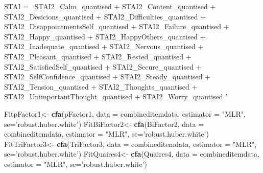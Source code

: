 \documentclass[]{article}
\newenvironment{Shaded}{\begin{snugshade}}{\end{snugshade}}
\newcommand{\KeywordTok}[1]{\textcolor[rgb]{0.13,0.29,0.53}{\textbf{#1}}}
\newcommand{\DataTypeTok}[1]{\textcolor[rgb]{0.13,0.29,0.53}{#1}}
\newcommand{\StringTok}[1]{\textcolor[rgb]{0.31,0.60,0.02}{#1}}
\newcommand{\NormalTok}[1]{#1}
\begin{document}
\begin{Shaded}
\begin{Highlighting}[]
\StringTok{STAI =~ STAI2_Calm_quantised +}
\StringTok{        STAI2_Content_quantised +}
\StringTok{        STAI2_Desicions_quantised +}
\StringTok{        STAI2_Difficulties_quantised +}
\StringTok{        STAI2_DisappointmentsSelf_quantised +}
\StringTok{        STAI2_Failure_quantised +}
\StringTok{        STAI2_Happy_quantised +}
\StringTok{        STAI2_HappyOthers_quantised +}
\StringTok{        STAI2_Inadequate_quantised +}
\StringTok{        STAI2_Nervous_quantised +}
\StringTok{        STAI2_Pleasant_quantised +}
\StringTok{        STAI2_Rested_quantised +}
\StringTok{        STAI2_SatisfiedSelf_quantised +}
\StringTok{        STAI2_Secure_quantised +}
\StringTok{        STAI2_SelfConfidence_quantised +}
\StringTok{        STAI2_Steady_quantised +}
\StringTok{        STAI2_Tension_quantised +}
\StringTok{        STAI2_Thoughts_quantised +}
\StringTok{        STAI2_UnimportantThought_quantised +}
\StringTok{        STAI2_Worry_quantised}
\StringTok{'}

\NormalTok{FitpFactor1<-}\StringTok{ }\KeywordTok{cfa}\NormalTok{(pFactor1, }\DataTypeTok{data =}\NormalTok{ combineditemdata, }\DataTypeTok{estimator =} \StringTok{"MLR"}\NormalTok{, }\DataTypeTok{se=}\StringTok{'robust.huber.white'}\NormalTok{)}
\NormalTok{FitBiFactor2<-}\StringTok{ }\KeywordTok{cfa}\NormalTok{(BiFactor2, }\DataTypeTok{data =}\NormalTok{ combineditemdata, }\DataTypeTok{estimator =} \StringTok{"MLR"}\NormalTok{, }\DataTypeTok{se=}\StringTok{'robust.huber.white'}\NormalTok{)}
\NormalTok{FitTriFactor3<-}\StringTok{ }\KeywordTok{cfa}\NormalTok{(TriFactor3, }\DataTypeTok{data =}\NormalTok{ combineditemdata, }\DataTypeTok{estimator =} \StringTok{"MLR"}\NormalTok{, }\DataTypeTok{se=}\StringTok{'robust.huber.white'}\NormalTok{)}
\NormalTok{FitQuaires4<-}\StringTok{ }\KeywordTok{cfa}\NormalTok{(Quaires4, }\DataTypeTok{data =}\NormalTok{ combineditemdata, }\DataTypeTok{estimator =} \StringTok{"MLR"}\NormalTok{, }\DataTypeTok{se=}\StringTok{'robust.huber.white'}\NormalTok{)}


\end{Highlighting}
\end{Shaded}
\end{document}
